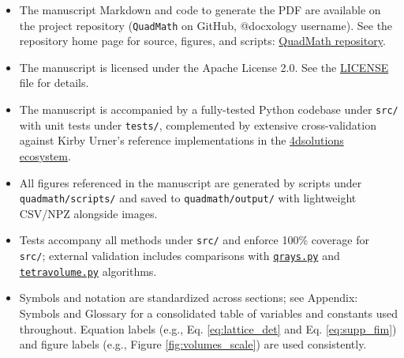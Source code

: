\documentclass[
  10pt,
]{article}
\providecommand{\tightlist}{%
  \setlength{\itemsep}{0pt}\setlength{\parskip}{0pt}}
\begin{document}
\begin{itemize}
\tightlist
\item
  The manuscript Markdown and code to generate the PDF are available on
  the project repository (\texttt{QuadMath} on GitHub, @docxology
  username). See the repository home page for source, figures, and
  scripts: \href{https://github.com/docxology/quadmath}{QuadMath
  repository}.
\item
  The manuscript is licensed under the Apache License 2.0. See the
  \href{../LICENSE}{LICENSE} file for details.
\item
  The manuscript is accompanied by a fully-tested Python codebase under
  \texttt{src/} with unit tests under \texttt{tests/}, complemented by
  extensive cross-validation against Kirby Urner's reference
  implementations in the
  \href{https://github.com/4dsolutions}{4dsolutions ecosystem}.
\item
  All figures referenced in the manuscript are generated by scripts
  under \texttt{quadmath/scripts/} and saved to
  \texttt{quadmath/output/} with lightweight CSV/NPZ alongside images.
\item
  Tests accompany all methods under \texttt{src/} and enforce 100\%
  coverage for \texttt{src/}; external validation includes comparisons
  with
  \href{https://github.com/4dsolutions/m4w/blob/main/qrays.py}{\texttt{qrays.py}}
  and
  \href{https://github.com/4dsolutions/m4w/blob/main/tetravolume.py}{\texttt{tetravolume.py}}
  algorithms.
\item
  Symbols and notation are standardized across sections; see Appendix:
  Symbols and Glossary for a consolidated table of variables and
  constants used throughout. Equation labels (e.g., Eq.
  \eqref{eq:lattice_det} and Eq. \eqref{eq:supp_fim}) and figure labels
  (e.g., Figure \ref{fig:volumes_scale}) are used consistently.
\end{itemize}
\end{document}
